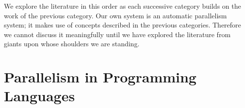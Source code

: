 \noindent
We explore the literature in this order as each successive category builds
on the work of the previous category.
Our own system is an automatic parallelism system;
it makes use of concepts described in the previous categories.
Therefore
we cannot discuss it meaningfully until we have explored the literature
from giants upon whose shoulders we are standing.

% 

\section{Parallelism in Programming Languages}
\label{sec:literature_review}


